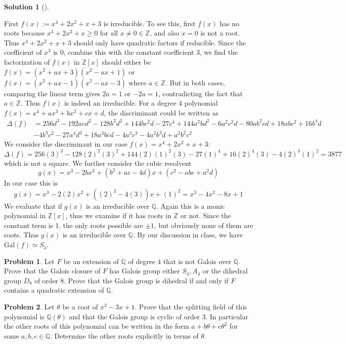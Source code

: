 \documentclass{article}
\theoremstyle{definition}
\newtheorem{prob}{Problem}
\newtheorem*{sol}{Solution}
\newenvironment{sols}[1][]{%
  \begin{sol}[#1]$ $\par\nobreak\ignorespaces
}{%
  \end{sol}
}
\newcommand{\QQ}{\mathbb Q}
\newcommand{\ZZ}{\mathbb Z}
\newcommand{\Gal}{\text{Gal}}
\begin{document}
\begin{sols}
	First $f(x) := x^4 + 2x^2 + x + 3$ is irreducible.
	To see this, first $f(x)$ has no roots because $x^4 + 2 x^2 + x \geq 0$ for all $x \neq 0 \in \ZZ$, and	also $x = 0$ is not a root.
	Thus $x^4 + 2x^2 + x + 3$ should only have quadratic factors if reducible.
	Since the coefficient of $x^3$ is 0, combine this with the constant coefficient 3, we find the factorization of $f(x)$ in $\ZZ[x]$ should either be $f(x) = (x^2 + ax + 3) (x^2 - ax + 1)$ or $f(x) = (x^2 + ax - 1) (x^2 - ax - 3)$ where $a \in \ZZ$.
	But in both cases, comparing the linear term gives $2a = 1$ or $-2 a = 1$, contradicting the fact that $a \in \ZZ$.
	Thus $f(x)$ is indeed an irreducible.
	For a degree 4 polynomial $f(x) = x^4 + a x^3 + b x^2 + c x + d$, the discriminant could be written as
	\[
		\begin{split}
			\Delta(f) &= 256 d^3 - 192 a c d^2- 128 b^2 d^2 + 144 b c^2 d - 27 c^4 + 144 a^2 b d^2 - 6 a^2 c^2 d - 80 a b^2 c d + 18 a b c^2 + 16 b^4 d\\
			&- 4 b^3 c^2 - 27 a^4 d^2 + 18 a^3 bcd - 4 a^3 c^3 - 4 a^2 b^3 d + a^2 b^2 c^2
		\end{split}
	\]
	We consider the discriminant in our case $f(x) = x^4 + 2x^2 + x + 3$:
	\[
		\Delta(f) = 256 (3)^3  - 128 (2)^2 (3)^2  + 144 (2) (1)^2 (3) - 27 (1)^4 + 16 (2)^4 (3)  - 4 (2)^3 (1)^2 = 3877 
	\]
	which is not a square.
	We further consider the cubic resolvent
	\[
		g(x) = x^3 - 2 b x^2 + (b^2 + ac - 4d) x + (c^2 - abc + a^2 d)
	\]
	In our case this is 
	\[
		g(x) = x^3 - 2 (2) x^2 + ((2)^2 - 4 (3)) x + (1)^2 = x^3 - 4 x^2 - 8x + 1
	\]
	We evaluate that if $g(x)$ is an irreducible over $\QQ$.
	Again this is a monic polynomial in $\ZZ[x]$, thus we examine if it has roots in $\ZZ$ or not.
	Since the constant term is 1, the only roots possible are $\pm 1$, but obviously none of them are roots.
	Thus $g(x)$ is an irreducible over $\QQ$. 
	By our discussion in class, we have $\Gal(f) \simeq S_4$.
\end{sols}

\setcounter{prob}{10}
\begin{prob}
	Let $F$ be an extension of $\QQ$ of degree 4 that is not Galois over $\QQ$.
	Prove that the Galois closure of $F$ has Galois group either $S_4, A_4$ or the dihedral group $D_8$ of order 8.
	Prove that the Galois group is dihedral if and only if $F$ contains a quadratic extension of $\QQ$.
\end{prob}

\setcounter{prob}{17}
\begin{prob}
	Let $\theta$ be a root of $x^3 - 3 x + 1$.
	Prove that the splitting field of this polynomial is $\QQ(\theta)$ and that the Galois group is cyclic of order 3.
	In particular the other roots of this polynomial can be written in the form $a + b \theta + c \theta^2$ for some $a, b, c \in \QQ$.
	Determine the other roots explicitly in terms of $\theta$.
\end{prob}
\end{document}

